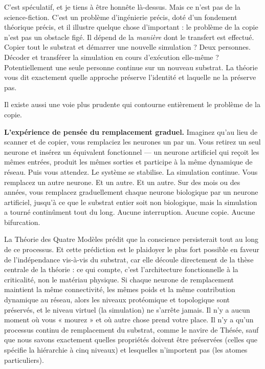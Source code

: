 \documentclass[11pt, twoside, openright]{book}
\begin{document}
C'est spéculatif, et je tiens à être honnête là-dessus. Mais ce n'est pas de la science-fiction. C'est un problème d'ingénierie précis, doté d'un fondement théorique précis, et il illustre quelque chose d'important : le problème de la copie n'est pas un obstacle figé. Il dépend de la \textit{manière} dont le transfert est effectué. Copier tout le substrat et démarrer une nouvelle simulation ? Deux personnes. Décoder et transférer la simulation en cours d'exécution elle-même ? Potentiellement une seule personne continue sur un nouveau substrat. La théorie vous dit exactement quelle approche préserve l'identité et laquelle ne la préserve pas.

Il existe aussi une voie plus prudente qui contourne entièrement le problème de la copie.

\textbf{L'expérience de pensée du remplacement graduel.} Imaginez qu'au lieu de scanner et de copier, vous remplaciez les neurones un par un. Vous retirez un seul neurone et insérez un équivalent fonctionnel --- un neurone artificiel qui reçoit les mêmes entrées, produit les mêmes sorties et participe à la même dynamique de réseau. Puis vous attendez. Le système se stabilise. La simulation continue. Vous remplacez un autre neurone. Et un autre. Et un autre. Sur des mois ou des années, vous remplacez graduellement chaque neurone biologique par un neurone artificiel, jusqu'à ce que le substrat entier soit non biologique, mais la simulation a tourné continûment tout du long. Aucune interruption. Aucune copie. Aucune bifurcation.

La Théorie des Quatre Modèles prédit que la conscience persisterait tout au long de ce processus. Et cette prédiction est le plaidoyer le plus fort possible en faveur de l'indépendance vis-à-vis du substrat, car elle découle directement de la thèse centrale de la théorie : ce qui compte, c'est l'architecture fonctionnelle à la criticalité, non le matériau physique. Si chaque neurone de remplacement maintient la même connectivité, les mêmes poids et la même contribution dynamique au réseau, alors les niveaux protéomique et topologique sont préservés, et le niveau virtuel (la simulation) ne s'arrête jamais. Il n'y a aucun moment où vous « mourez » et où autre chose prend votre place. Il n'y a qu'un processus continu de remplacement du substrat, comme le navire de Thésée, sauf que nous savons exactement quelles propriétés doivent être préservées (celles que spécifie la hiérarchie à cinq niveaux) et lesquelles n'importent pas (les atomes particuliers).
\end{document}
